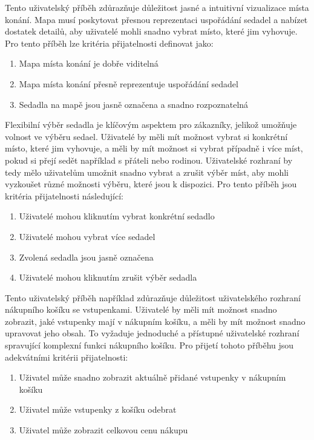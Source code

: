 Tento uživatelský příběh zdůrazňuje důležitost jasné a intuitivní vizualizace místa konání.
Mapa musí poskytovat přesnou reprezentaci uspořádání sedadel a nabízet dostatek detailů, aby uživatelé mohli snadno vybrat místo, které jim vyhovuje.
Pro tento příběh lze kritéria přijatelnosti definovat jako:
\begin{enumerate}
    \item Mapa místa konání je dobře viditelná
    \item Mapa místa konání přesně reprezentuje uspořádání sedadel
    \item Sedadla na mapě jsou jasně označena a snadno rozpoznatelná
\end{enumerate}

\newcommand{\userstoryseatselection}{
}
\userstoryseatselection

Flexibilní výběr sedadla je klíčovým aspektem pro zákazníky, jelikož umožňuje volnost ve výběru sedael.
Uživatelé by měli mít možnost vybrat si konkrétní místo, které jim vyhovuje, a měli by mít možnost si vybrat případně i více míst, pokud si přejí sedět například s přáteli nebo rodinou.
Uživatelské rozhraní by tedy mělo uživatelům umožnit snadno vybrat a zrušit výběr míst, aby mohli vyzkoušet různé možnosti výběru, které jsou k dispozici.
Pro tento příběh jsou kritéria přijatelnosti následující:
\begin{enumerate}
    \item Uživatelé mohou kliknutím vybrat konkrétní sedadlo
    \item Uživatelé mohou vybrat více sedadel
    \item Zvolená sedadla jsou jasně označena
    \item Uživatelé mohou kliknutím zrušit výběr sedadla
\end{enumerate}

\newcommand{\userstoryshoppingcart}{
}
\userstoryshoppingcart

Tento uživatelský příběh například zdůrazňuje důležitost uživatelského rozhraní nákupního košíku se vstupenkami.
Uživatelé by měli mít možnost snadno zobrazit, jaké vstupenky mají v nákupním košíku, a měli by mít možnost snadno upravovat jeho obsah.
To vyžaduje jednoduché a přístupné uživatelské rozhraní spravující komplexní funkci nákupního košíku.
Pro přijetí tohoto příběhu jsou adekvátními kritérii přijatelnosti:
\begin{enumerate}
    \item Uživatel může snadno zobrazit aktuálně přidané vstupenky v nákupním košíku
    \item Uživatel může vstupenky z košíku odebrat
    \item Uživatel může zobrazit celkovou cenu nákupu
\end{enumerate}

